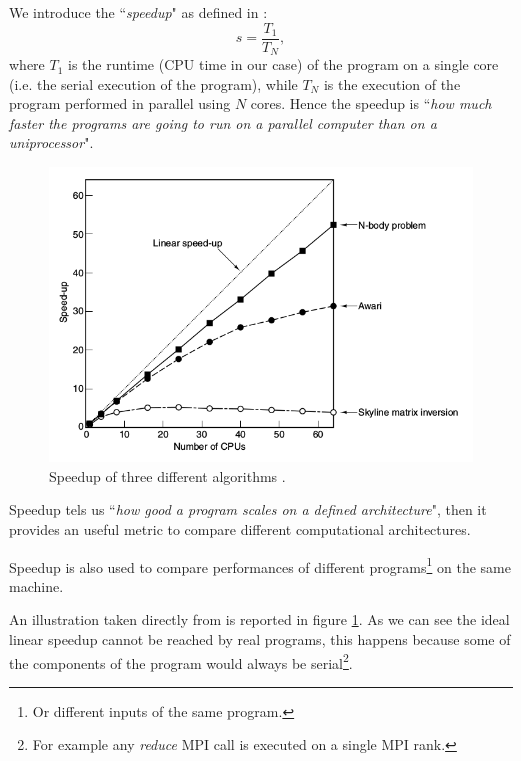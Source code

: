 \documentclass[a4paper,12pt]{article}
\begin{document}
We introduce the ``\textit{speedup}" as defined in \cite{Tanenbaum} : 
\begin{equation}\label{eq:speedup}
	s = \frac{T_{1}}{T_{N}},
\end{equation}
where $T_{1}$ is the runtime (CPU time in our case) of the program on a single core (i.e. the serial execution of the program), while $T_{N}$ is the execution of the program performed in parallel using $N$ cores.
Hence the speedup is ``\textit{how much faster the programs are going to run on a parallel computer than on a
uniprocessor}"\cite[p.648]{Tanenbaum}.

\begin{figure}[hhh!]
\begin{center}
	\includegraphics[scale=0.5]{tanenbaum_speedup.png}	
	\caption{Speedup of three different algorithms \cite{Tanenbaum}.}
	\label{fig:TanenbaumSpeedup}
\end{center}
\end{figure}

Speedup tels us ``\textit{how good a program scales on a defined architecture}", then it provides an useful metric to compare different computational architectures.

Speedup is also used to compare performances of different programs\footnote{Or different inputs of the same program.} on the same machine.



An illustration taken directly from \cite{Tanenbaum} is reported in figure \ref{fig:TanenbaumSpeedup}.
As we can see the ideal linear speedup cannot be reached by real programs, this happens because some of the components of the program would always be serial\footnote{For example any \textit{reduce} MPI call is executed on a single MPI rank.}.
\end{document}
